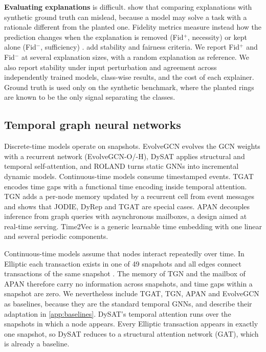 \textbf{Evaluating explanations} is difficult. \citet{faber2021groundtruth} show that comparing explanations with synthetic ground truth can mislead, because a model may solve a task with a rationale different from the planted one. Fidelity metrics measure instead how the prediction changes when the explanation is removed (Fid$^+$, necessity) or kept alone (Fid$^-$, sufficiency) \citep{yuan2021subgraphx, amara2022graphframex}. \citet{agarwal2023graphxai} add stability and fairness criteria. We report Fid$^+$ and Fid$^-$ at several explanation sizes, with a random explanation as reference. We also report stability under input perturbation and agreement across independently trained models, class-wise results, and the cost of each explainer. Ground truth is used only on the synthetic benchmark, where the planted rings are known to be the only signal separating the classes.

\subsection{Temporal graph neural networks}

Discrete-time models operate on snapshots. EvolveGCN \citep{pareja2020evolvegcn} evolves the GCN weights with a recurrent network (EvolveGCN-O/-H), DySAT \citep{sankar2020dysat} applies structural and temporal self-attention, and ROLAND \citep{you2022roland} turns static GNNs into incremental dynamic models. Continuous-time models consume timestamped events. TGAT \citep{xu2020tgat} encodes time gaps with a functional time encoding inside temporal attention. TGN \citep{rossi2020tgn} adds a per-node memory updated by a recurrent cell from event messages and shows that JODIE, DyRep and TGAT are special cases. APAN \citep{wang2021apan} decouples inference from graph queries with asynchronous mailboxes, a design aimed at real-time serving. Time2Vec \citep{kazemi2019time2vec} is a generic learnable time embedding with one linear and several periodic components.

Continuous-time models assume that nodes interact repeatedly over time. In Elliptic each transaction exists in one of 49 snapshots and all edges connect transactions of the same snapshot \citep{weber2019anti}. The memory of TGN and the mailbox of APAN therefore carry no information across snapshots, and time gaps within a snapshot are zero. We nevertheless include TGAT, TGN, APAN and EvolveGCN as baselines, because they are the standard temporal GNNs, and describe their adaptation in \ref{app:baselines}. DySAT's temporal attention runs over the snapshots in which a node appears. Every Elliptic transaction appears in exactly one snapshot, so DySAT reduces to a structural attention network (GAT), which is already a baseline.

